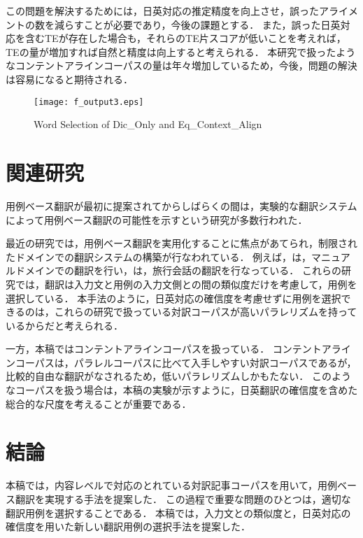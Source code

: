 \documentclass{nlp}
\begin{document}
この問題を解決するためには，日英対応の推定精度を向上させ，誤ったアライメントの数を減らすことが必要であり，今後の課題とする．
また，誤った日英対応を含むTEが存在した場合も，それらのTE片スコアが低いことを考えれば，TEの量が増加すれば自然と精度は向上すると考えられる．
本研究で扱ったようなコンテントアラインコーパスの量は年々増加しているため，今後，問題の解決は容易になると期待される．

	\begin{figure*}
	\begin{center}
		\texttt{[image: f\_output3.eps]}
	\end{center}
	
	\caption{Word Selection of {\sc Dic\_Only} and {\sc Eq\_Context\_Align}}
	\label{f_output3.eps}
	\end{figure*}

\section{関連研究}

用例ベース翻訳\cite{Nagao1984}が最初に提案されてからしばらくの間は，実験的な翻訳システムによって用例ベース翻訳の可能性を示すという研究が多数行われた\cite{Sato1990a,Sadler1990,Maruyama1992,Furuse1994}．

最近の研究では，用例ベース翻訳を実用化することに焦点があてられ，制限されたドメインでの翻訳システムの構築が行なわれている．
例えば，\cite{Richardson2001,Menezes2001}は，マニュアルドメインでの翻訳を行い，\cite{Imamura2002}は，旅行会話の翻訳を行なっている．
これらの研究では，翻訳は入力文と用例の入力文側との間の類似度だけを考慮して，用例を選択している．
本手法のように，日英対応の確信度を考慮せずに用例を選択できるのは，これらの研究で扱っている対訳コーパスが高いパラレリズムを持っているからだと考えられる．

一方，本稿ではコンテントアラインコーパスを扱っている．
コンテントアラインコーパスは，パラレルコーパスに比べて入手しやすい対訳コーパスであるが，比較的自由な翻訳がなされるため，低いパラレリズムしかもたない．
このようなコーパスを扱う場合は，本稿の実験が示すように，日英翻訳の確信度を含めた総合的な尺度を考えることが重要である．

\section{結論}

本稿では，内容レベルで対応のとれている対訳記事コーパスを用いて，用例ベース翻訳を実現する手法を提案した．
この過程で重要な問題のひとつは，適切な翻訳用例を選択することである．
本稿では，入力文との類似度と，日英対応の確信度を用いた新しい翻訳用例の選択手法を提案した．\\
\end{document}
